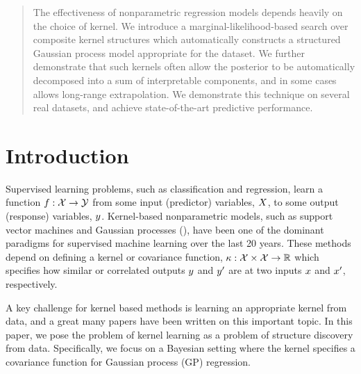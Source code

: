 \documentclass[twoside]{article}
\begin{document}

\begin{abstract}
The effectiveness of nonparametric regression models depends heavily on the choice of kernel.
We introduce a marginal-likelihood-based search over composite kernel structures which automatically constructs a structured Gaussian process model appropriate for the dataset.
We further demonstrate that such kernels often allow the posterior to be automatically decomposed into a sum of interpretable components, and in some cases allows long-range extrapolation.
We demonstrate this technique on several real datasets, and achieve state-of-the-art predictive performance.
\end{abstract}

\section{Introduction}

Supervised learning problems, such as classification and regression, learn a function ${f : \mathcal{X} \to \mathcal{Y}}$ from some input (predictor) variables, $X$, to some output (response) variables, $y$.
Kernel-based nonparametric models, such as support vector machines and Gaussian processes (\gp{}), have been one of the dominant paradigms for supervised machine learning over the last 20 years.
These methods depend on defining a kernel or covariance function, $\kappa : \mathcal{X} \times \mathcal{X} \to \mathbb{R}$ which specifies how similar or correlated outputs $y$ and $y'$ are at two inputs $x$ and $x'$, respectively.

A key challenge for kernel based methods is learning an appropriate kernel from data, and a great many papers have been written on this important topic.
In this paper, we pose the problem of kernel learning as a problem of structure discovery from data.
Specifically, we focus on a Bayesian setting where the kernel specifies a covariance function for Gaussian process (GP) regression.
\end{document}
